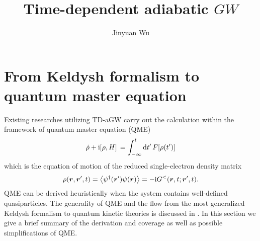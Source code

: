 \documentclass[hyperref, a4paper]{article}
\title{Time-dependent adiabatic $GW$}
\author{Jinyuan Wu}
\newcommand*{\ii}{\mathrm{i}}
\begin{document}
\maketitle

\section{From Keldysh formalism to quantum master equation}

Existing researches \cite{chan2021giant} utilizing TD-aGW carry out the calculation 
within the framework of quantum master equation (QME)
\begin{equation}
    \dot{\rho} + \ii \comm*{\rho}{H} = \int_{-\infty}^{t} \dd{t'} F[\rho(t')]
\end{equation}
which is the equation of motion of the 
reduced single-electron density matrix 
\begin{equation}
    \rho(\vb*{r}, \vb*{r}', t) = \expval{\psi^\dagger(\vb*{r}') \psi(\vb*{r})}
    = - \ii G^<(\vb*{r}, t; \vb*{r}', t).
\end{equation}
QME can be derived heuristically 
when the system contains well-defined quasiparticles.
The generality of QME and the flow from the most generalized Keldysh formalism 
to quantum kinetic theories is discussed in 
\cite{rammer1986quantum,vspivcka2005long,vspivcka2005long2,vspivcka2005long3}.
In this section we give a brief summary of the derivation 
and coverage as well as possible simplifications of QME.
\end{document}
